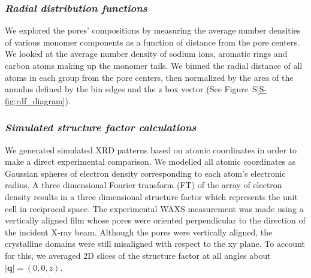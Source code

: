 \documentclass[journal=jpcbfk,manuscript=article]{achemso}
\begin{document}




  \subsubsection{\textit{Radial distribution functions}}

  We explored the pores' compositions by measuring the average number densities
  of various monomer components as a function of distance from the pore centers.
  We looked at the average number density of sodium ions, aromatic rings and 
  carbon atoms making up the monomer tails. We binned the radial distance of all
  atoms in each group from the pore centers, then normalized by the area of the
  annulus defined by the bin edges and the z box vector (See Figure~S\ref{S-fig:rdf_diagram}). 

  \subsubsection{\textit{Simulated structure factor calculations}}\label{method:xrd}
  
  We generated simulated XRD patterns based on atomic coordinates in order to make
  a direct experimental comparison. We modelled all atomic coordinates as Gaussian
  spheres of electron density corresponding to each atom's electronic radius. A 
  three dimensional Fourier transform (FT) of the array of electron density results in a three dimensional
  structure factor which represents the unit cell in reciprocal space. The
  experimental WAXS measurement was made using a vertically aligned film whose 
  pores were oriented perpendicular to the direction of the incident X-ray beam. 
  Although the pores were vertically aligned, the crystalline domains were still
  misaligned with respect to the xy plane. To account for this, we averaged
  2D slices of the structure factor at all angles about $|\mathbf{q}| = (0, 0, z)$. 
\end{document}
